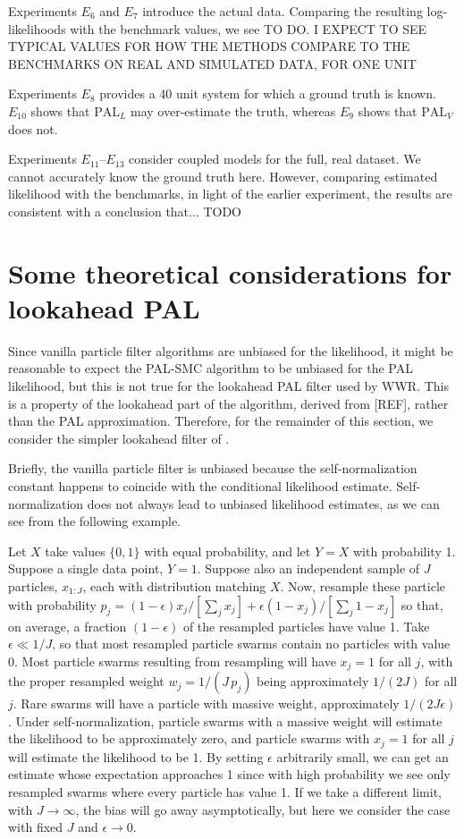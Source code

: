 \documentclass{article}
\newcommand\PALL{$\mathrm{PAL}_L$} %
\newcommand\PALV{$\mathrm{PAL}_V$} %
\newcommand\eic[1]{{\color{Orange} #1}}
\begin{document}
Experiments $E_6$ and $E_7$ introduce the actual data. Comparing the resulting log-likelihoods with the benchmark values, we see \eic{TO DO. I EXPECT TO SEE TYPICAL VALUES FOR HOW THE METHODS COMPARE TO THE BENCHMARKS ON REAL AND SIMULATED DATA, FOR ONE UNIT}

Experiments $E_8$ provides a 40 unit system for which a ground truth is known.  $E_{10}$ shows that {\PALL} may over-estimate the truth, whereas $E_9$ shows that {\PALV} does not.

Experiments $E_{11}$--$E_{13}$ consider coupled models for the full, real dataset. 
We cannot accurately know the ground truth here. 
However, comparing estimated likelihood with the benchmarks, in light of the earlier experiment, the results are consistent with a conclusion that... \eic{TODO}

\section{Some theoretical considerations for lookahead PAL}

 Since vanilla particle filter algorithms are unbiased for the likelihood, it might be reasonable to expect the PAL-SMC algorithm to be unbiased for the PAL likelihood, but this is not true for the lookahead PAL filter used by WWR. 
 This is a property of the lookahead part of the algorithm, derived from [REF], rather than the PAL approximation. 
 Therefore, for the remainder of this section, we consider the simpler lookahead filter of \citet{rimella23}.
 
 Briefly, the vanilla particle filter is unbiased because the self-normalization constant happens to coincide with the conditional likelihood estimate. 
 Self-normalization does not always lead to unbiased likelihood estimates, as we can see from the following example.

Let $X$ take values $\{0,1\}$ with equal probability, and let $Y=X$ with probability 1. 
Suppose a single data point, $Y=1$. 
Suppose also an independent sample of $J$ particles, $x_{1:J}$, each with distribution matching $X$. 
Now, resample these particle with probability $p_j = (1-\epsilon) x_j/[\sum_j x_j] + \epsilon(1-x_j)/[\sum_j 1-x_j]$ so that, on average, a fraction $(1-\epsilon)$ of the resampled particles have value 1. 
Take $\epsilon \ll 1/J$, so that most resampled particle swarms contain no particles with value 0. 
Most particle swarms resulting from resampling will have $x_j = 1$ for all $j$, with the proper resampled weight $w_j = 1/(J\, p_j)$ being approximately $1/(2J)$ for all $j$. 
Rare swarms will have a particle with massive weight, approximately $1/(2J\epsilon)$. 
Under self-normalization, particle swarms with a massive weight will estimate the likelihood to be approximately zero, and particle swarms with $x_j=1$ for all $j$ will estimate the likelihood to be 1. 
By setting $\epsilon$ arbitrarily small, we can get an estimate whose expectation approaches 1 since with high probability we see only resampled swarms where every particle has value 1. 
If we take a different limit, with $J \to \infty$, the bias will go away asymptotically, but here we consider the case with fixed $J$ and $\epsilon \to 0$.
\end{document}
